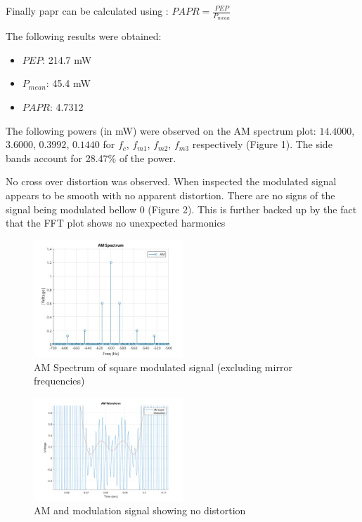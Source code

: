 \documentclass[a4paper]{article}
\begin{document}
            Finally \gls{papr} can be calculated using : $PAPR = \frac{PEP}{P_{mean}}$

            The following results were obtained: 
                
        \begin{itemize}
            \item $PEP$: 214.7 mW
            \item $P_{mean}$: 45.4 mW
            \item $PAPR$: 4.7312
        \end{itemize}

        The following powers (in mW) were observed on the AM spectrum plot: $14.4000$, $3.6000$, $0.3992$, $0.1440$ for $f_c$, $f_{m1}$, $f_{m2}$, $f_{m3}$ respectively (Figure 1). The side bands account for 28.47\% of the power.

        No cross over distortion was observed. When inspected the modulated signal appears to be smooth with no apparent distortion. There are no signs of the signal being modulated bellow 0 (Figure 2). This is further backed up by the fact that the FFT plot shows no unexpected harmonics

        \begin{figure}[htbp]
        \centering

        \includegraphics[width=0.5\textwidth]{Images/AM_RX_1/Square Wave/AM Spectrum.jpg}
        \caption{AM Spectrum of square modulated signal (excluding mirror frequencies)}

        \end{figure}

        \begin{figure}[htbp]
        \centering

        \includegraphics[width=0.5\textwidth]{Images/AM_RX_1/Square Wave/No Distortion.png}
        \caption{AM and modulation signal showing no distortion}

        \end{figure}
\end{document}

